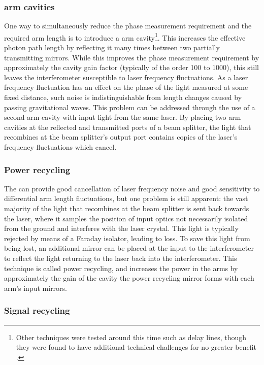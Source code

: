 \subsubsection{\label{sec:fabry-perot-cavities}\FP{} arm cavities}
One way to simultaneously reduce the phase measurement requirement and the required arm length is to introduce a \FP{} arm cavity\footnote{Other techniques were tested around this time such as delay lines, though they were found to have additional technical challenges for no greater benefit .}. This increases the effective photon path length by reflecting it many times between two partially transmitting mirrors. While this improves the phase measurement requirement by approximately the cavity gain factor (typically of the order \num{100} to \num{1000}), this still leaves the interferometer susceptible to laser frequency fluctuations. As a laser frequency fluctuation has an effect on the phase of the light measured at some fixed distance, such noise is indistinguishable from length changes caused by passing gravitational waves. This problem can be addressed through the use of a second \FP{} arm cavity with input light from the same laser. By placing two arm cavities at the reflected and transmitted ports of a beam splitter, the light that recombines at the beam splitter's output port contains  copies of the laser's frequency fluctuations which cancel.

\subsubsection{Power recycling}
The \FPMI{} can provide good cancellation of laser frequency noise and good sensitivity to differential arm length fluctuations, but one problem is still apparent: the vast majority of the light that recombines at the beam splitter is sent back towards the laser, where it samples the position of input optics not necessarily isolated from the ground and interferes with the laser crystal. This light is typically rejected by means of a Faraday isolator, leading to loss. To save this light from being lost, an additional mirror can be placed at the input to the interferometer to reflect the light returning to the laser back into the interferometer. This technique is called power recycling, and increases the power in the arms by approximately the gain of the cavity the power recycling mirror forms with each arm's input mirrors.

\subsubsection{Signal recycling}

